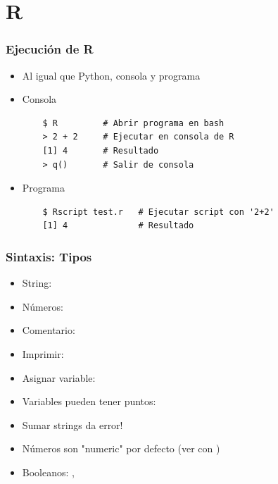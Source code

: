 \documentclass[14pt,aspectratio=169,xcolor=dvipsnames]{beamer}
\begin{document}
\section{R}
\begin{frame}[fragile]\frametitle{Ejecución de R}
    \begin{itemize}
        \item Al igual que Python, consola y programa
        \item Consola
            \begin{verbatim}
    $ R         # Abrir programa en bash
    > 2 + 2     # Ejecutar en consola de R
    [1] 4       # Resultado 
    > q()       # Salir de consola
            \end{verbatim}
        \item Programa
            \begin{verbatim}
    $ Rscript test.r   # Ejecutar script con '2+2'
    [1] 4              # Resultado 
            \end{verbatim}

    \end{itemize}
\end{frame}
\begin{frame}[fragile]\frametitle{Sintaxis: Tipos}
    \begin{itemize}
        \item String: 
        \item Números: 
        \item Comentario: 
        \item Imprimir: 
        \item Asignar variable: 
        \item Variables pueden tener puntos: 
        \item Sumar strings da error!
                
            \begin{flushright} \end{flushright}
        \item Números son "numeric" por defecto (ver con )
        \item Booleanos: ,
    \end{itemize}
\end{frame}
\end{document}

